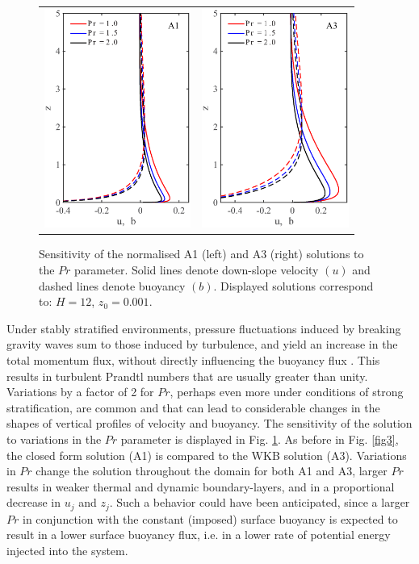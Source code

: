 \begin{figure}
    \begin{center}
    \begin{tabular}{c c}
    	\includegraphics[width= 48.0mm]{Pr_sensitivity_plot.eps} &
	\includegraphics[width= 48.0mm]{Pr_sensitivity_plot_grisogono.eps}
    \end{tabular}
    \caption{Sensitivity of the normalised A1 (left) and A3 (right) solutions to the $Pr$ parameter. Solid lines denote down-slope velocity $(u)$ and dashed lines denote buoyancy $(b)$. Displayed solutions correspond to: $H=12$, $z_0 = 0.001$.}
    \label{fig4}
    \end{center}
\end{figure}
%
Under stably stratified environments, pressure fluctuations induced by breaking gravity waves sum to those induced by turbulence, and yield an increase in the total momentum flux, without directly influencing the buoyancy flux \citep{Mahrt1998}. 
This results in turbulent Prandtl numbers that are usually greater than unity. Variations by a factor of 2 for $Pr$, perhaps even more under conditions of strong stratification, are common and that can lead to considerable changes in the shapes of vertical profiles of velocity and buoyancy. 
The sensitivity of the solution to variations in the $Pr$ parameter is displayed in Fig. \ref{fig4}. As before in Fig. \ref{fig3}, the closed form solution (A1) is compared to the WKB solution (A3).
Variations in $Pr$ change the solution throughout the domain for both A1 and A3, larger $Pr$ results in weaker thermal and dynamic boundary-layers, and in a proportional decrease in $u_j$ and $z_j$. 
Such a behavior could have been anticipated, since a larger $Pr$ in conjunction with the constant (imposed) surface buoyancy is expected to result in a lower surface buoyancy flux, i.e. in a lower rate of potential energy injected into the system.

